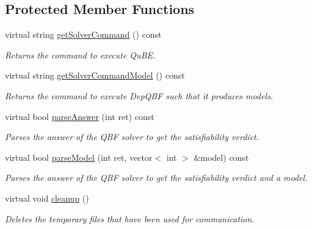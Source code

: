 \subsection*{Protected Member Functions}
\begin{DoxyCompactItemize}
\item 
virtual string \hyperlink{classQuBEExt_a2af26a63952d83a50a4bd3d72bfc572a}{get\-Solver\-Command} () const 
\begin{DoxyCompactList}\small\item\em Returns the command to execute Qu\-B\-E. \end{DoxyCompactList}\item 
virtual string \hyperlink{classQuBEExt_a846ea873ec83e57213f1931d85cb8bd0}{get\-Solver\-Command\-Model} () const 
\begin{DoxyCompactList}\small\item\em Returns the command to execute Dep\-Q\-B\-F such that it produces models. \end{DoxyCompactList}\item 
virtual bool \hyperlink{classExtQBFSolver_a11ddbf3980824453238071e8a036f804}{parse\-Answer} (int ret) const 
\begin{DoxyCompactList}\small\item\em Parses the answer of the Q\-B\-F solver to get the satisfiability verdict. \end{DoxyCompactList}\item 
virtual bool \hyperlink{classExtQBFSolver_a3b43f437ee9286b62be1de73932b6636}{parse\-Model} (int ret, vector$<$ int $>$ \&model) const 
\begin{DoxyCompactList}\small\item\em Parses the answer of the Q\-B\-F solver to get the satisfiability verdict and a model. \end{DoxyCompactList}\item 
virtual void \hyperlink{classExtQBFSolver_a3ee48837c5e937e4d3a5b3c2a6b761d3}{cleanup} ()
\begin{DoxyCompactList}\small\item\em Deletes the temporary files that have been used for communication. \end{DoxyCompactList}\end{DoxyCompactItemize}
